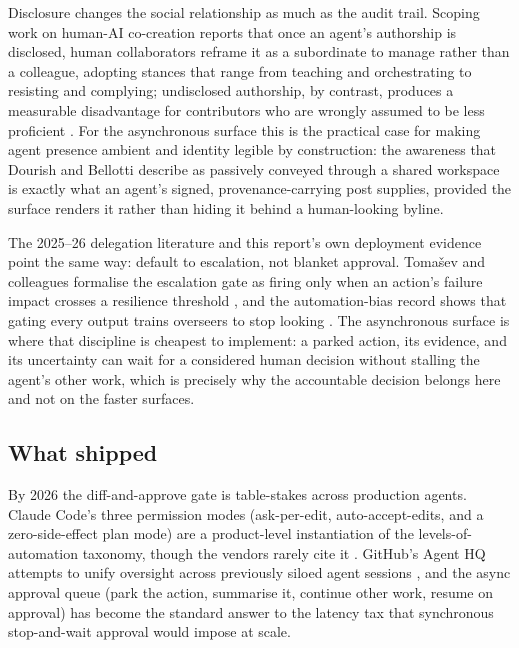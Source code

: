 Disclosure changes the social relationship as much as the audit trail. Scoping work on human-AI co-creation reports that once an agent's authorship is disclosed, human collaborators reframe it as a subordinate to manage rather than a colleague, adopting stances that range from teaching and orchestrating to resisting and complying; undisclosed authorship, by contrast, produces a measurable disadvantage for contributors who are wrongly assumed to be less proficient \parencite{HCIScoping2025}. For the asynchronous surface this is the practical case for making agent presence ambient and identity legible by construction: the awareness that Dourish and Bellotti describe as passively conveyed through a shared workspace is exactly what an agent's signed, provenance-carrying post supplies, provided the surface renders it rather than hiding it behind a human-looking byline.

\begin{evidencebox}[title={Escalation over approval, on the surface built for it}]
The 2025--26 delegation literature and this report's own deployment evidence point the same way: default to escalation, not blanket approval. Tomašev and colleagues formalise the escalation gate as firing only when an action's failure impact crosses a resilience threshold \parencite{Tomasev2026Delegation}, and the automation-bias record shows that gating every output trains overseers to stop looking \parencite{AutomationBias2012}. The asynchronous surface is where that discipline is cheapest to implement: a parked action, its evidence, and its uncertainty can wait for a considered human decision without stalling the agent's other work, which is precisely why the accountable decision belongs here and not on the faster surfaces.
\end{evidencebox}

\subsection{What shipped}

By 2026 the diff-and-approve gate is table-stakes across production agents. Claude Code's three permission modes (ask-per-edit, auto-accept-edits, and a zero-side-effect plan mode) are a product-level instantiation of the levels-of-automation taxonomy, though the vendors rarely cite it \parencite{ClaudeCodeDesktop2026}. GitHub's Agent HQ attempts to unify oversight across previously siloed agent sessions \parencite{AgentHQ2026}, and the async approval queue (park the action, summarise it, continue other work, resume on approval) has become the standard answer to the latency tax that synchronous stop-and-wait approval would impose at scale.

